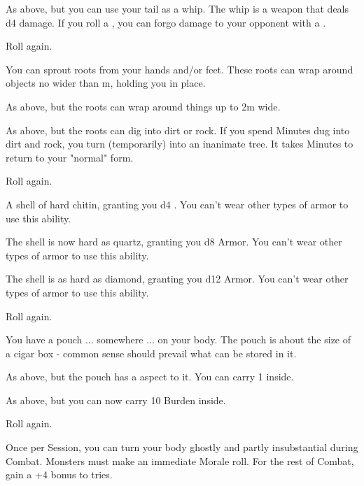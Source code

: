 \begin{multicols*}{2}
 As above, but you can use your tail as a whip.  The whip is a \DEX weapon that deals d4 damage.  If you roll a , you can forgo damage to  your opponent with a \RBTRY{\DEX}{\DEX}.

 Roll again.

\NC[Name=Rooty]

 You can sprout roots from your hands and/or feet.  These roots can wrap around objects no wider than \OneHalf m, holding you in place.

 As above, but the roots can wrap around things up to 2m wide.

 As above, but the roots can dig into dirt or rock. If you spend Minutes dug into dirt and rock, you turn (temporarily) into an inanimate tree. It takes Minutes to return to your "normal" form. 

 Roll again.

\cbreak

\NC[Name=Shell]

  A shell of hard chitin, granting you d4 . You can't wear other types of armor to use this ability.

  The shell is now hard as quartz, granting you d8 Armor. You can't wear other types of armor to use this ability.

  The shell is as hard as diamond, granting you d12 Armor. You can't wear other types of armor to use this ability.

  Roll again.

\NC[Name=Skin Bag]

  You have a pouch ... somewhere ... on your body.  The pouch is about the size of a cigar box - common sense should prevail what can be stored in it.

  As above, but the pouch has a  aspect to it.  You can carry 1  inside.

  As above, but you can now carry 10 Burden inside.

  Roll again.

\NC[Name=Smoky]

 Once per Session, you can turn your body ghostly and partly insubstantial during Combat.  Monsters must make an immediate Morale roll. For the rest of Combat, gain a +4 bonus to  tries.


\end{multicols*}
